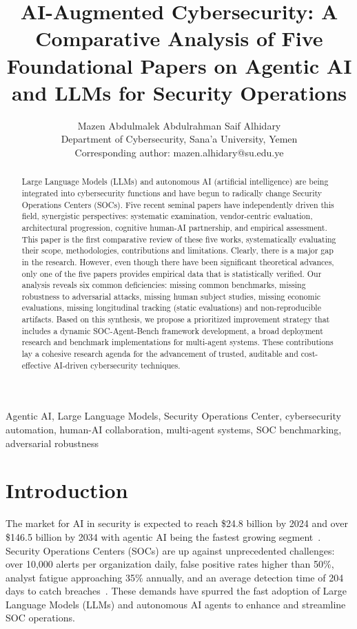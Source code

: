 \documentclass[journal]{IEEEtran}
\begin{document}
\title{AI-Augmented Cybersecurity: A Comparative Analysis of Five Foundational Papers on Agentic AI and LLMs for Security Operations}

\author{Mazen Abdulmalek Abdulrahman Saif Alhidary \\
Department of Cybersecurity, Sana'a University, Yemen \\
Corresponding author: mazen.alhidary@su.edu.ye}

\maketitle

\begin{abstract}
Large Language Models (LLMs) and autonomous AI (artificial intelligence) are being integrated into cybersecurity functions and have begun to radically change Security Operations Centers (SOCs). Five recent seminal papers have independently driven this field, synergistic perspectives: systematic examination, vendor-centric evaluation, architectural progression, cognitive human-AI partnership, and empirical assessment. This paper is the first comparative review of these five works, systematically evaluating their scope, methodologies, contributions and limitations. Clearly, there is a major gap in the research. However, even though there have been significant theoretical advances, only one of the five papers provides empirical data that is statistically verified. Our analysis reveals six common deficiencies: missing common benchmarks, missing robustness to adversarial attacks, missing human subject studies, missing economic evaluations, missing longitudinal tracking (static evaluations) and non-reproducible artifacts. Based on this synthesis, we propose a prioritized improvement strategy that includes a dynamic SOC-Agent-Bench framework development, a broad deployment research and benchmark implementations for multi-agent systems. These contributions lay a cohesive research agenda for the advancement of trusted, auditable and cost-effective AI-driven cybersecurity techniques.
\end{abstract}

\begin{IEEEkeywords}
Agentic AI, Large Language Models, Security Operations Center, cybersecurity automation, human-AI collaboration, multi-agent systems, SOC benchmarking, adversarial robustness
\end{IEEEkeywords}

\section{Introduction}
The market for AI in security is expected to reach \$24.8 billion by 2024 and over \$146.5 billion by 2034 with agentic AI being the fastest growing segment~\cite{kshetri2025}. Security Operations Centers (SOCs) are up against unprecedented challenges: over 10,000 alerts per organization daily, false positive rates higher than 50\%, analyst fatigue approaching 35\% annually, and an average detection time of 204 days to catch breaches~\cite{srinivas2025,kim2025}. These demands have spurred the fast adoption of Large Language Models (LLMs) and autonomous AI agents to enhance and streamline SOC operations.
\end{document}
